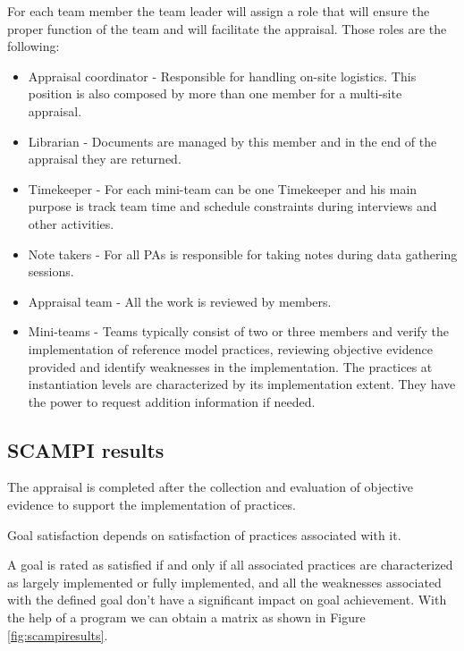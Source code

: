 For each team member the team leader will assign a role that will ensure the proper function of the team and will facilitate the appraisal. Those roles are the following:
\begin{itemize}
	\item Appraisal coordinator - Responsible for handling on-site logistics. This position is also composed by more than one member for a multi-site appraisal.
	\item Librarian - Documents are managed by this member and in the end of the appraisal they are returned.
	\item Timekeeper - For each mini-team can be one Timekeeper and his main purpose is track team time and schedule constraints during interviews and other activities.
	\item Note takers - For all PAs is responsible for taking notes during data gathering sessions.
	\item Appraisal team - All the work is reviewed by members.
	\item Mini-teams - Teams typically consist of two or three members and verify the implementation of reference model practices, reviewing objective evidence provided and identify weaknesses in the implementation. The practices at instantiation levels are characterized by its implementation extent. They have the power to request addition information if needed. 
\end{itemize}

\subsection{SCAMPI results}

The appraisal is completed after the collection and evaluation of objective evidence to support the implementation of practices.

Goal satisfaction depends on satisfaction of practices associated with it.

A goal is rated as satisfied if and only if all associated practices are characterized as largely implemented or fully implemented, and all the weaknesses associated with the defined goal don't have a significant impact on goal achievement.
With the help of a program we can obtain a matrix as shown in Figure \ref{fig:scampiresults}.

% 



